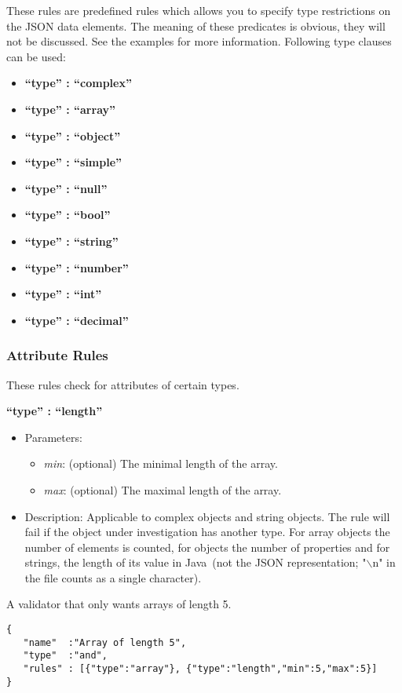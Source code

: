 \documentclass[a4paper]{article}
\newcommand{\ruledef}[3]{
\medskip
\textbf{#1}

\begin{itemize}
\setlength{\itemsep}{1pt}
\setlength{\parskip}{0pt}
\setlength{\parsep}{0pt}
   \item Parameters: #2
   \item Description: #3
\end{itemize}
}
\newcommand{\rulename}[1]{\textbf{``type'' : ``#1''}}
\newcommand{\java}{Java}
\newcommand{\param}[1]{\textsl{#1}:}
\begin{document}
These rules are predefined rules which allows you to specify type restrictions on the JSON data elements. The meaning of these predicates is obvious, they will not be discussed. See the examples for more information. Following type clauses can be used: 

\begin{itemize}
\setlength{\itemsep}{1pt}
\setlength{\parskip}{0pt}
\setlength{\parsep}{0pt}
   \item  \rulename{complex}
   \item  \rulename{array}
   \item  \rulename{object}
   \item  \rulename{simple}
   \item  \rulename{null}
   \item  \rulename{bool}
   \item  \rulename{string}
   \item  \rulename{number}
   \item  \rulename{int}
   \item  \rulename{decimal}
\end{itemize}

\subsubsection{ Attribute Rules }

These rules check for attributes of certain types.

\ruledef{\rulename{length}}{
\begin{itemize}
   \item \param{min} (optional) The minimal length of the array.
   \item \param{max} (optional) The maximal length of the array.
\end{itemize}} {
Applicable to complex objects and string objects. The rule will fail if the object under investigation has another type. For array objects the number of elements is counted, for objects the number of properties and for strings, the length of its value in \java\ (not the JSON representation; "$\backslash$n" in the file counts as a single character).}

A validator that only wants arrays of length 5.
\begin{lstlisting}
{
   "name"  :"Array of length 5",
   "type"  :"and",
   "rules" : [{"type":"array"}, {"type":"length","min":5,"max":5}]
}
\end{lstlisting}
\end{document}
